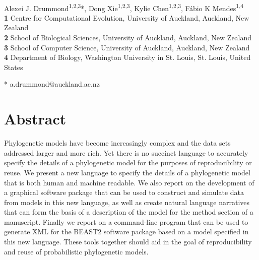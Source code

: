 \documentclass[10pt,letterpaper,table]{article}
\begin{document}
\vspace*{0.2in}

\begin{flushleft}
{\Large
\textbf{} %
}
\newline
\\
Alexei J. Drummond\textsuperscript{1,2,3}*,
Dong Xie\textsuperscript{1,2,3},
Kylie Chen\textsuperscript{1,2,3},
F\'{a}bio K Mendes\textsuperscript{1,4}
\\
\bigskip
\textbf{1} Centre for Computational Evolution, University of Auckland, Auckland, New Zealand
\\
\textbf{2} School of Biological Sciences, University of Auckland, Auckland, New Zealand
\\
\textbf{3} School of Computer Science, University of Auckland, Auckland, New Zealand
\\
\textbf{4} Department of Biology, Washington University in St. Louis, St. Louis, United States
\\
\bigskip

% 
%

* a.drummond@auckland.ac.nz

\end{flushleft}
\section*{Abstract}
  Phylogenetic models have become increasingly complex and the data sets addressed larger and more rich.
  Yet there is no succinct language to accurately specify the details of a phylogenetic model for the purposes of reproducibility or reuse.
  We present a new language to specify the details of a phylogenetic model that is both human and machine readable.
  We also report on the development of a graphical software package that can be used to construct and simulate data from
  models in this new language, as well as create natural language narratives that can form the basis of a description of the model for the method section of a manuscript.
  Finally we report on a command-line program that can be used to generate XML for the BEAST2 software package based
  on a model specified in this new language.
  These tools together should aid in the goal of reproducibility and reuse of probabilistic phylogenetic models.
\end{document}
